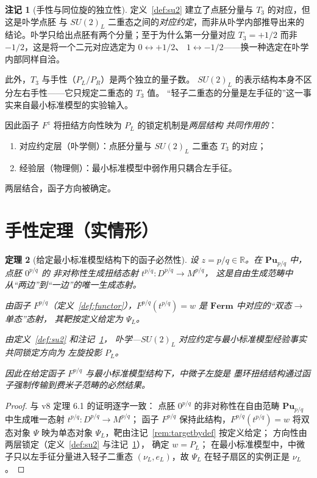 \documentclass[11pt]{ctexart}
\theoremstyle{plain}
\newtheorem{thm}{定理}[section]
\theoremstyle{definition}
\newtheorem{rem}[thm]{注记}
\newcommand{\Cat}{\mathbf}
\begin{document}
\begin{rem}[手性与同位旋的独立性]\label{rem:independence}
定义~\ref{def:su2} 建立了点胚分量与 $T_3$ 的对应，但这是卟学点胚
与 $SU(2)_L$ 二重态之间的\emph{对应约定}，而非从卟学内部推导出来的
结论。卟学只给出点胚有两个分量；至于为什么第一分量对应 $T_3=+1/2$
而非 $-1/2$，这是将一个二元对应选定为 $0\leftrightarrow +1/2$、
$1\leftrightarrow -1/2$——换一种选定在卟学内部同样自洽。

此外，$T_3$ 与手性（$P_L/P_R$）是两个独立的量子数。
$SU(2)_L$ 的表示结构本身不区分左右手性——它只规定二重态的 $T_3$ 值。
“轻子二重态的分量是左手征的”这一事实来自最小标准模型的实验输入。

因此函子 $F^z$ 将扭结方向性映为 $P_L$ 的锁定机制是\emph{两层结构
共同作用的}：
\begin{enumerate}
\item 对应约定层（卟学侧）：点胚分量与 $SU(2)_L$ 二重态 $T_3$ 的对应；
\item 经验层（物理侧）：最小标准模型中弱作用只耦合左手征。
\end{enumerate}
两层结合，函子方向被确定。
\end{rem}

\section{手性定理（实情形）}

\begin{thm}[给定最小标准模型结构下的函子必然性]\label{thm:main}
设 $z = p/q\in\mathbb{R}$。在 $\Cat{Pu}_{p/q}$ 中，点胚 $0^{p/q}$ 的
非对称性生成扭结态射 $t^{p/q}: D^{p/q}\to M^{p/q}$，
这是自由生成范畴中从“两边”到“一边”的唯一生成态射。

由函子 $F^{p/q}$（定义~\ref{def:functor}），$F^{p/q}(t^{p/q}) = w$
是 $\Cat{Ferm}$ 中对应的“双态$\to$单态”态射，
其靶按定义给定为 $\Psi_L$。

由定义~\ref{def:su2} 和注记~\ref{rem:independence}，
卟学---$SU(2)_L$ 对应约定与最小标准模型经验事实共同锁定方向为
左旋投影 $P_L$。

因此在给定函子 $F^{p/q}$ 与最小标准模型结构下，中微子左旋是
墨环扭结结构通过函子强制传输到费米子范畴的必然结果。
\end{thm}

\begin{proof}
与 v8 定理 6.1 的证明逐字一致：
点胚 $0^{p/q}$ 的非对称性在自由范畴 $\Cat{Pu}_{p/q}$ 中生成唯一态射
$t^{p/q}: D^{p/q}\to M^{p/q}$；
函子 $F^{p/q}$ 保持此结构，$F^{p/q}(t^{p/q}) = w$ 将双态对象 $\Psi$
映为单态对象 $\Psi_L$，靶由注记~\ref{rem:targetbydef} 按定义给定；
方向性由两层锁定（定义~\ref{def:su2} 与注记~\ref{rem:independence}），
确定 $w = P_L$；
在最小标准模型中，中微子只以左手征分量进入轻子二重态
$(\nu_L,e_L)$，故 $\Psi_L$ 在轻子扇区的实例正是 $\nu_L$。
\end{proof}
\end{document}
